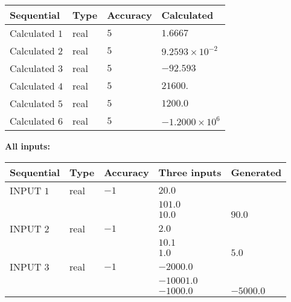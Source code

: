 \documentclass[12pt]{article}
\begin{document}
   
   
   
\noindent{}
   
   
  
  
\noindent\begin{tabular}{|l|l|l|l|}
\hline
 Sequential & Type & Accuracy & Calculated \\ 
\hline
 
 
  Calculated $           1$ & real & $           5 $ & 
 $ 1.6667 $ 
 \\  \hline  
 
 
  Calculated $           2$ & real & $           5 $ & 
 $ 9.2593 \times 10^{-2} $ 
 \\  \hline  
 
 
  Calculated $           3$ & real & $           5 $ & 
 $ -92.593 $ 
 \\  \hline  
 
 
  Calculated $           4$ & real & $           5 $ & 
 $ 21600. $ 
 \\  \hline  
 
 
  Calculated $           5$ & real & $           5 $ & 
 $ 1200.0 $ 
 \\  \hline  
 
 
  Calculated $           6$ & real & $           5 $ & 
 $ -1.2000 \times 10^{6} $ 
 \\  \hline  
 \end{tabular}
   
   
   
   
\noindent\vspace{0.1in}\hspace{-0.08in} {\textbf{\Large{All inputs: }}}
   
   
  
  
\noindent\begin{tabular}{|l|l|l|l|l|}
\hline
 Sequential & Type & Accuracy & Three inputs & Generated \\ 
\hline
 
 
  INPUT $           1$ & real & $          -1 $ & $
 20.0
  $ & \\
  & & &  $
 101.0
  $ & \\
  & & &  $
 10.0
 $ & $ 90.0 $ 
 \\  \hline  
 
 
  INPUT $           2$ & real & $          -1 $ & $
 2.0
  $ & \\
  & & &  $
 10.1
  $ & \\
  & & &  $
 1.0
 $ & $ 5.0 $ 
 \\  \hline  
 
 
  INPUT $           3$ & real & $          -1 $ & $
 -2000.0
  $ & \\
  & & &  $
 -10001.0
  $ & \\
  & & &  $
 -1000.0
 $ & $ -5000.0 $ 
 \\  \hline  
 \end{tabular}
   
\end{document}
